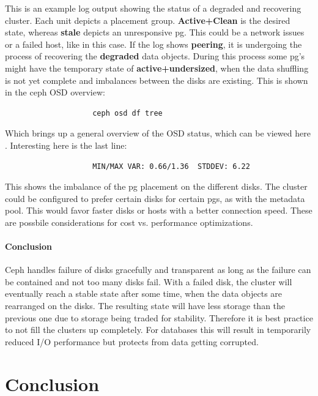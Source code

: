 \documentclass[titlepage, a4paper, 11pt]{scrartcl}
\begin{document}
                This is an example log output showing the status of a degraded and recovering cluster.
                Each unit depicts a placement group. \textbf{Active+Clean} is the desired state, whereas \textbf{stale} depicts an unresponsive pg. This could be a network issues or a failed host, like in this case. If the log shows \textbf{peering}, it is undergoing the process of recovering the \textbf{degraded} data objects. During this process some pg's might have the temporary state of \textbf{active+undersized}, when the data shuffling is not yet complete and imbalances between the disks are existing. This is shown in the ceph OSD overview:

                \begin{lstlisting}
                    ceph osd df tree
                \end{lstlisting}

                Which brings up a general overview of the OSD status, which can be viewed here
                \cite{osdoverview}. Interesting here is the last line:

                \begin{lstlisting}
                    MIN/MAX VAR: 0.66/1.36  STDDEV: 6.22
                \end{lstlisting}

                This shows the imbalance of the pg placement on the different disks. The cluster could be configured to prefer certain disks for certain pgs, as with the metadata pool. This would favor faster disks or hosts with a better connection speed. These are possbile considerations for cost vs. performance optimizations.

                \paragraph{Conclusion} Ceph handles failure of disks gracefully and transparent as long as the failure can be contained and not too many disks fail. With a failed disk, the cluster will eventually reach a stable state after some time, when the data objects are rearranged on the disks. The resulting state will have less storage than the previous one due to storage being traded for stability. Therefore it is best practice to not fill the clusters up completely. For databases this will result in temporarily reduced I/O performance but protects from data getting corrupted.

    \section{Conclusion}\label{conclusion}
\end{document}
